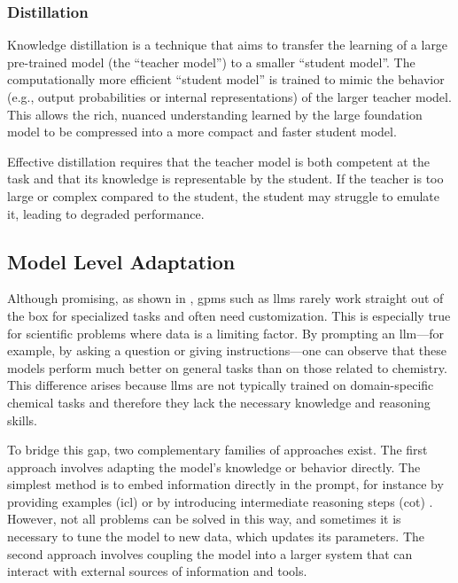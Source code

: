 \subsubsection{Distillation} \label{sec:distillation}
Knowledge distillation is a technique that aims to transfer the learning of a large pre-trained model (the \enquote{teacher model}) to a smaller \enquote{student model}. \autocite{hinton2015distilling}
The computationally more efficient \enquote{student model} is trained to mimic the behavior (e.g., output probabilities or internal representations) of the larger teacher model. 
This allows the rich, nuanced understanding learned by the large foundation model to be compressed into a more compact and faster student model.\autocite{sanh2019distilbert}

Effective distillation requires that the teacher model is both competent at the task and that its knowledge is representable by the student. 
If the teacher is too large or complex compared to the student, the student may struggle to emulate it, leading to degraded performance. \autocite{liu2024wisdom}



\subsection{Model Level Adaptation}
\label{sec:model_adaptation}
Although promising, as shown in , \glspl{gpm} such as \glspl{llm} rarely work straight out of the box for specialized tasks and often need customization. This is especially true for scientific problems where data is a limiting factor. 
By prompting an \gls{llm}---for example, by asking a question or giving instructions---one can observe that these models perform much better on general tasks than on those related to chemistry. 
This difference arises because \glspl{llm} are not typically trained on domain-specific chemical tasks and therefore they lack the necessary knowledge and reasoning skills. 

To bridge this gap, two complementary families of approaches exist. The first approach involves adapting the model's knowledge or behavior directly. The simplest method is to embed information directly in the prompt, for instance by providing examples (\gls{icl}) \autocite{brown2020language} or by introducing intermediate reasoning steps (\gls{cot}) \autocite{wei2022chain}. However, not all problems can be solved in this way, and sometimes it is necessary to tune the model to new data, which updates its parameters. 
The second approach involves coupling the model into a larger system that can interact with external sources of information and tools.


